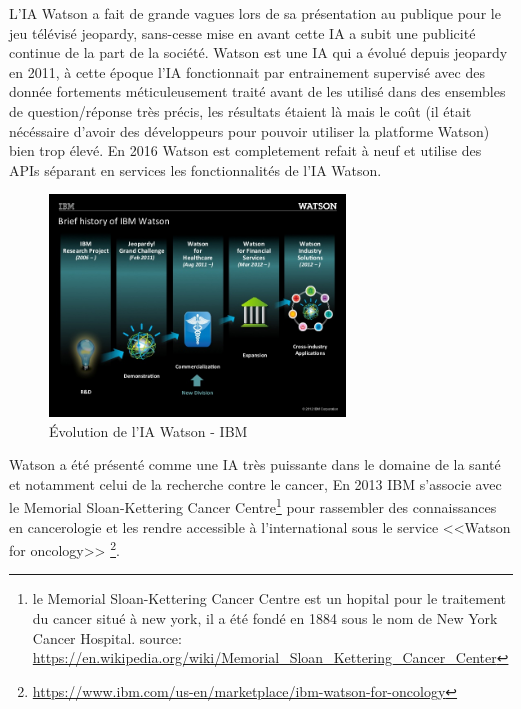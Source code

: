 L'IA Watson a fait de grande vagues lors de sa présentation au publique pour le jeu télévisé jeopardy,
sans-cesse mise en avant cette IA a subit une publicité continue de la part de la société.
Watson est une IA qui a évolué depuis jeopardy en 2011, à cette époque l'IA fonctionnait
par entrainement supervisé avec des donnée fortements méticuleusement traité avant de les utilisé
dans des ensembles de question/réponse très précis, les résultats étaient là mais le coût (il était
nécéssaire d'avoir des développeurs pour pouvoir utiliser la platforme Watson) bien trop élevé.
En 2016 Watson est completement refait à neuf et utilise des \gls{API}s séparant en services
les fonctionnalités de l'IA Watson. \newline

\begin{figure}[H]
    \centering
    \includegraphics[width=0.7\textwidth]{Images/historyofwatson}
    \caption{Évolution de l'IA Watson - IBM}
    \label{fig:historyofwatson}
\end{figure}


Watson a été présenté comme une IA très puissante dans le domaine de la santé et notamment
celui de la recherche contre le cancer, En 2013 IBM s'associe avec
le Memorial Sloan-Kettering Cancer Centre\footnote{
    le Memorial Sloan-Kettering Cancer Centre est un hopital pour le traitement du cancer situé à new
    york, il a été fondé en 1884 sous le nom de New York Cancer Hospital. \newline
    source: \url{https://en.wikipedia.org/wiki/Memorial_Sloan_Kettering_Cancer_Center}

} pour rassembler des connaissances en
cancerologie et les rendre accessible à l'international sous le service <<Watson for oncology>>
\footnote{\url{https://www.ibm.com/us-en/marketplace/ibm-watson-for-oncology}}. \newline

